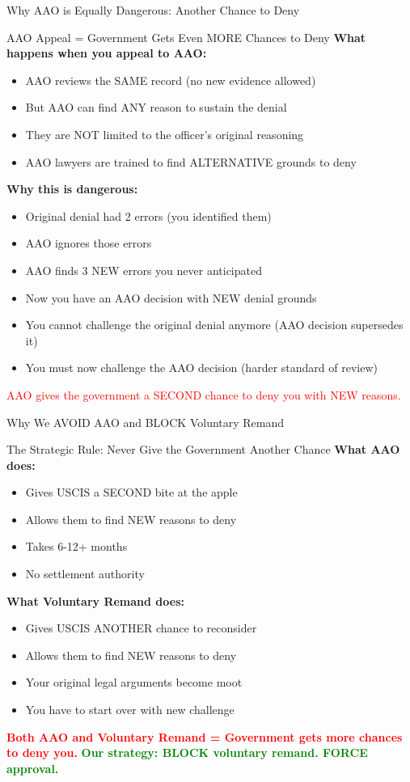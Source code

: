 \documentclass[11pt]{beamer}
\begin{document}
	\begin{frame}{Why AAO is Equally Dangerous: Another Chance to Deny}
		\scriptsize
		\begin{block}{AAO Appeal = Government Gets Even MORE Chances to Deny}
			\textbf{What happens when you appeal to AAO:}
			\begin{itemize}
				\item AAO reviews the SAME record (no new evidence allowed)
				\item But AAO can find ANY reason to sustain the denial
				\item They are NOT limited to the officer's original reasoning
				\item AAO lawyers are trained to find ALTERNATIVE grounds to deny
			\end{itemize}
			\textbf{Why this is dangerous:}
			\begin{itemize}
				\item Original denial had 2 errors (you identified them)
				\item AAO ignores those errors
				\item AAO finds 3 NEW errors you never anticipated
				\item Now you have an AAO decision with NEW denial grounds
				\item You cannot challenge the original denial anymore (AAO decision supersedes it)
				\item You must now challenge the AAO decision (harder standard of review)
			\end{itemize}
			\textcolor{red}{AAO gives the government a SECOND chance to deny you with NEW reasons.}
		\end{block}
	\end{frame}
	
	\begin{frame}{Why We AVOID AAO and BLOCK Voluntary Remand}
		\scriptsize
		\begin{block}{The Strategic Rule: Never Give the Government Another Chance}
			\textbf{What AAO does:}
			\begin{itemize}
				\item Gives USCIS a SECOND bite at the apple
				\item Allows them to find NEW reasons to deny
				\item Takes 6-12+ months
				\item No settlement authority
			\end{itemize}
			\textbf{What Voluntary Remand does:}
			\begin{itemize}
				\item Gives USCIS ANOTHER chance to reconsider
				\item Allows them to find NEW reasons to deny
				\item Your original legal arguments become moot
				\item You have to start over with new challenge
			\end{itemize}
			\textcolor{red}{\textbf{Both AAO and Voluntary Remand = Government gets more chances to deny you.}}
			\textcolor{green}{\textbf{Our strategy: BLOCK voluntary remand. FORCE approval.}}
		\end{block}
	\end{frame}
	
\end{document}
